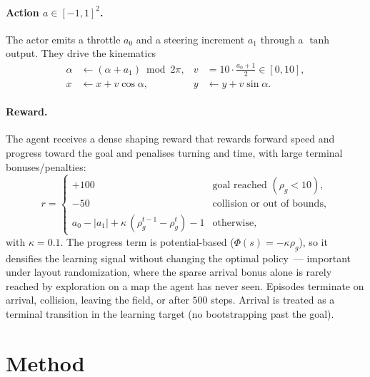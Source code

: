 \documentclass[11pt,a4paper]{article}
\begin{document}
\paragraph{Action $a\in[-1,1]^2$.}
The actor emits a throttle $a_0$ and a steering increment $a_1$ through a
$\tanh$ output. They drive the kinematics
\begin{align}
\alpha &\leftarrow (\alpha + a_1)\bmod 2\pi, &
v &= 10\cdot\tfrac{a_0+1}{2}\in[0,10], \\
x &\leftarrow x + v\cos\alpha, &
y &\leftarrow y + v\sin\alpha.
\end{align}

\paragraph{Reward.}
The agent receives a dense shaping reward that rewards forward speed and
progress toward the goal and penalises turning and time, with large terminal
bonuses/penalties:
\begin{equation}
r =
\begin{cases}
+100 & \text{goal reached } (\rho_g < 10),\\
-50  & \text{collision or out of bounds},\\
a_0 - |a_1| + \kappa\,(\rho_g^{t-1} - \rho_g^{t}) - 1 & \text{otherwise,}
\end{cases}
\end{equation}
with $\kappa = 0.1$. The progress term is potential-based
($\Phi(s) = -\kappa\rho_g$), so it densifies the learning signal without
changing the optimal policy~— important under layout randomization, where the
sparse arrival bonus alone is rarely reached by exploration on a map the agent
has never seen. Episodes terminate on arrival, collision, leaving the field,
or after $500$ steps. Arrival is treated as a terminal transition in the
learning target (no bootstrapping past the goal).

\section{Method}
\end{document}
